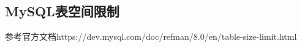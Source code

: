 \documentclass[../../../interview-questions.tex]{subfiles}
\begin{document}
\subsection{MySQL表空间限制}

参考官方文档https://dev.mysql.com/doc/refman/8.0/en/table-size-limit.html
\end{document}
